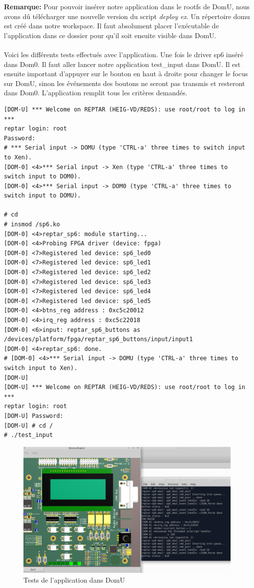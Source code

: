 \textbf{Remarque: }Pour pouvoir insérer notre application dans le rootfs de DomU, nous avons dû télécharger une nouvelle version du script \textit{deploy ex}. Un répertoire domu est créé dans notre workspace. Il faut absolument placer l'exécutable de l'application dans ce dossier pour qu'il soit ensuite visible dans DomU.\\\\
Voici les différents tests effectués avec l'application. Une fois le driver sp6 inséré dans Dom0. Il faut aller lancer notre application test\_input dans DomU. Il est ensuite important d'appuyer sur le bouton en haut à droite pour changer le focus sur DomU, sinon les événements des boutons ne seront pas transmis et resteront dans Dom0.
L'application remplit tous les critères demandés.
\begin{lstlisting}
[DOM-U] *** Welcome on REPTAR (HEIG-VD/REDS): use root/root to log in ***
reptar login: root
Password: 
# *** Serial input -> DOMU (type 'CTRL-a' three times to switch input to Xen).
[DOM-0] <4>*** Serial input -> Xen (type 'CTRL-a' three times to switch input to DOM0).
[DOM-0] <4>*** Serial input -> DOM0 (type 'CTRL-a' three times to switch input to DOMU).

# cd
# insmod /sp6.ko 
[DOM-0] <4>reptar_sp6: module starting...
[DOM-0] <4>Probing FPGA driver (device: fpga)
[DOM-0] <7>Registered led device: sp6_led0
[DOM-0] <7>Registered led device: sp6_led1
[DOM-0] <7>Registered led device: sp6_led2
[DOM-0] <7>Registered led device: sp6_led3
[DOM-0] <7>Registered led device: sp6_led4
[DOM-0] <7>Registered led device: sp6_led5
[DOM-0] <4>btns_reg address : 0xc5c20012
[DOM-0] <4>irq_reg address : 0xc5c22018
[DOM-0] <6>input: reptar_sp6_buttons as /devices/platform/fpga/reptar_sp6_buttons/input/input1
[DOM-0] <4>reptar_sp6: done.
# [DOM-0] <4>*** Serial input -> DOMU (type 'CTRL-a' three times to switch input to Xen).
[DOM-U] 
[DOM-U] *** Welcome on REPTAR (HEIG-VD/REDS): use root/root to log in ***
reptar login: root
[DOM-U] Password: 
[DOM-U] # cd /
# ./test_input 
\end{lstlisting}
\begin{figure}[H]
	\begin{center}
		\includegraphics[width=17cm]{img/dom05.png}
		\caption{Tests de l'application dans DomU}
		\label{dom05}
	\end{center}
\end{figure}
